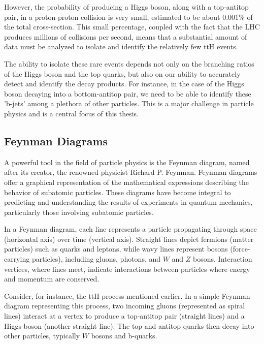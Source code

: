 However, the probability of producing a Higgs boson, along with a top-antitop pair, in a proton-proton collision is very
small, estimated to be about 0.001\% of the total cross-section. This small percentage, coupled with the fact that the
LHC produces millions of collisions per second, means that a substantial amount of data must be analyzed to isolate and
identify the relatively few ttH events.

The ability to isolate these rare events depends not only on the branching ratios of the Higgs boson and the top quarks,
but also on our ability to accurately detect and identify the decay products. For instance, in the case of the Higgs
boson decaying into a bottom-antitop pair, we need to be able to identify these 'b-jets' among a plethora of other
particles. This is a major challenge in particle physics and is a central focus of this thesis.

\subsection{Feynman Diagrams}



A powerful tool in the field of particle physics is the Feynman diagram, named after its creator, the renowned physicist
Richard P. Feynman. Feynman diagrams offer a graphical representation of the mathematical expressions describing the
behavior of subatomic particles. These diagrams have become integral to predicting and understanding the results of
experiments in quantum mechanics, particularly those involving subatomic particles.

In a Feynman diagram, each line represents a particle propagating through space (horizontal axis) over time (vertical
axis). Straight lines depict fermions (matter particles) such as quarks and leptons, while wavy lines represent bosons
(force-carrying particles), including gluons, photons, and $W$ and $Z$ bosons. Interaction vertices, where lines meet,
indicate interactions between particles where energy and momentum are conserved.

Consider, for instance, the ttH process mentioned earlier. In a simple Feynman diagram representing this process, two
incoming gluons (represented as spiral lines) interact at a vertex to produce a top-antitop pair (straight lines) and a
Higgs boson (another straight line). The top and antitop quarks then decay into other particles, typically $W$ bosons and
b-quarks.

